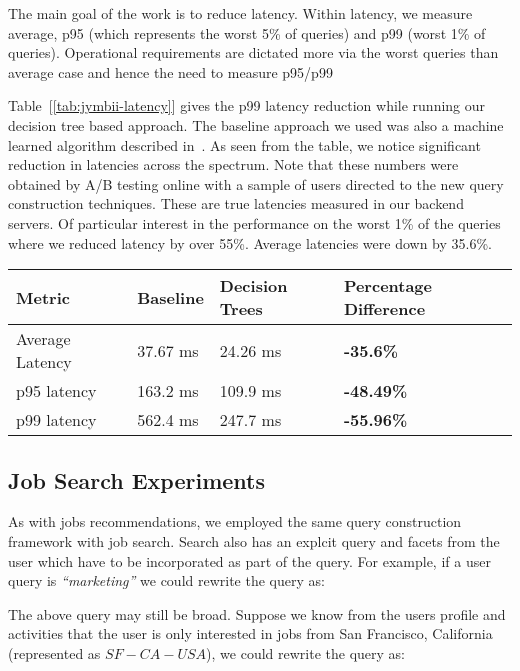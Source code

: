 The main goal of the work is to reduce latency. Within latency, we
measure average, p95 (which represents the worst 5\% of queries) and p99 (worst
1\% of queries). Operational requirements are dictated more via the worst
queries than average case and hence the need to measure p95/p99

Table~[\ref{tab:jymbii-latency}] gives the p99 latency reduction while running
our decision tree based approach. The baseline approach we used was also a
machine learned algorithm described in~\cite{borisyuk2016casmos}.
As seen from the table, we notice significant reduction in latencies across the
spectrum. Note that these numbers were obtained by A/B testing online with a
sample of users directed to the new query construction techniques. These are
true latencies measured in our backend servers. Of particular interest in the
performance on the worst 1\% of the queries where we reduced latency by over
55\%. Average latencies were down by 35.6\%.


\begin{table*}
\centering
\caption{Impact of Query Construction on Jobs Recommendations Latency}
\begin{tabular}{|l|l|l|l|} \hline
Metric&Baseline&Decision Trees&Percentage Difference \\ \hline
Average Latency& 37.67 ms&24.26  ms& \bf{-35.6\%} \\ \hline
p95 latency& 163.2 ms& 109.9 ms& \bf{-48.49\%} \\ \hline
p99 latency& 562.4 ms&247.7  ms& \bf{-55.96\%} \\ \hline
\end{tabular}
\label{tab:jymbii-latency}
\end{table*}

\subsection{Job Search Experiments}

As with jobs recommendations, we employed the same query construction framework
with job search. Search also has an explcit query and facets from the user
which have to be incorporated as part of the query. For example, if a user
query is {\it ``marketing''} we could rewrite the query as:


The above query may still be broad. Suppose we know from the users profile and
activities that the user is only interested in jobs from San Francisco,
California (represented as $SF-CA-USA$), we could rewrite the query as:

